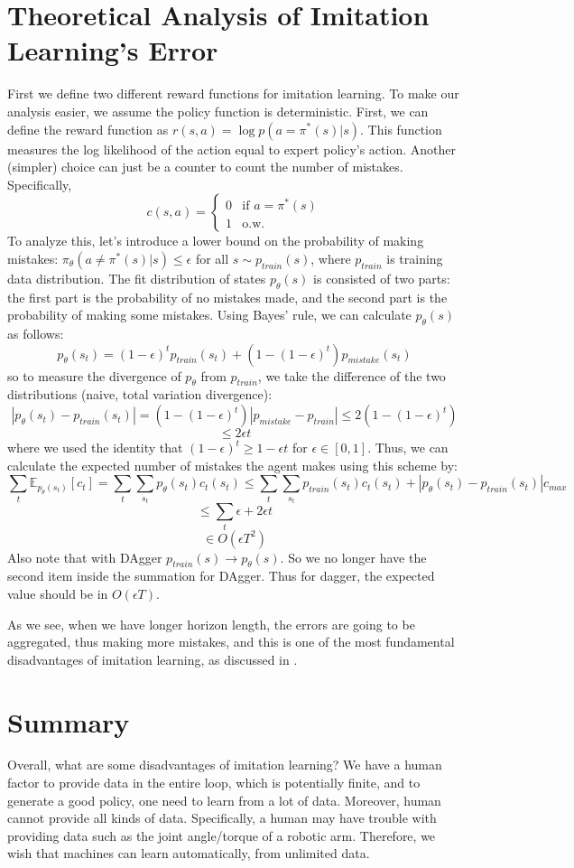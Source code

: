 \section{Theoretical Analysis of Imitation Learning's Error}
First we define two different reward functions for imitation learning. To make our analysis easier, we assume the policy function is deterministic. First, we can define the reward function as $r(s,a)=\log p(a=\pi^*(s)|s)$. This function measures the log likelihood of the action equal to expert policy's action. Another (simpler) choice can just be a counter to count the number of mistakes. Specifically, 
\[ c(s,a) = \begin{cases} 
          0 & \text{if } a = \pi^*(s) \\
          1 & \text{o.w.}
       \end{cases}
    \]
To analyze this, let's introduce a lower bound on the probability of making mistakes: $\pi_\theta(a\neq \pi^*(s)|s)\leq \epsilon$ for all $s\sim p_{train}(s)$, where $p_{train}$ is training data distribution. The fit distribution of states $p_\theta(s)$ is consisted of two parts: the first part is the probability of no mistakes made, and the second part is the probability of making some mistakes. Using Bayes' rule, we can calculate $p_\theta(s)$ as follows:
$$p_\theta(s_t) = (1-\epsilon)^tp_{train}(s_t)+(1-(1-\epsilon)^t)p_{mistake}(s_t)$$
so to measure the divergence of $p_\theta$ from $p_{train}$, we take the difference of the two distributions (naive, total variation divergence):
$$|p_\theta(s_t)-p_{train}(s_t)|=(1-(1-\epsilon)^t)|p_{mistake}-p_{train}|\leq2(1-(1-\epsilon)^t)$$
$$\leq 2\epsilon t$$
where we used the identity that $(1-\epsilon)^t\geq1-\epsilon t$ for $\epsilon\in [0,1]$. Thus, we can calculate the expected number of mistakes the agent makes using this scheme by:
$$\sum_t\mathbb{E}_{p_\theta(s_t)}[c_t] = \sum_t\sum_{s_t}p_\theta(s_t)c_t(s_t)\leq\sum_t\sum_{s_t}p_{train}(s_t)c_t(s_t)+|p_\theta(s_t)-p_{train}(s_t)|c_{max}$$
$$\leq\sum_t\epsilon+2\epsilon t$$
$$\in O(\epsilon T^2)$$
Also note that with DAgger $p_{train}(s)\rightarrow p_\theta(s)$. So we no longer have the second item inside the summation for DAgger. Thus for dagger, the expected value should be in $O(\epsilon T)$.

As we see, when we have longer horizon length, the errors are going to be aggregated, thus making more mistakes, and this is one of the most fundamental disadvantages of imitation learning, as discussed in \cite{ross2011reduction}.
\section{Summary}
Overall, what are some disadvantages of imitation learning? We have a human factor to provide data in the entire loop, which is potentially finite, and to generate a good policy, one need to learn from a lot of data. Moreover, human cannot provide all kinds of data. Specifically, a human may have trouble with providing data such as the joint angle/torque of a robotic arm. Therefore, we wish that machines can learn automatically, from unlimited data.